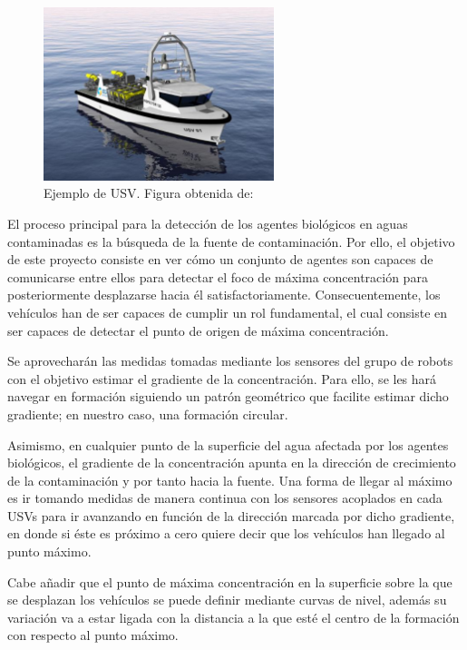 \begin{figure}[htb]
\centering
\includegraphics[width=0.6\textwidth]{figures/USV.eps}
\caption{Ejemplo de USV. Figura obtenida de: \cite{Imagen_Tomada}}\label{fig:USV}
\end{figure}

El proceso principal para la detección de los agentes biológicos en aguas contaminadas es la búsqueda de la fuente de contaminación. Por ello, el objetivo de este proyecto consiste en ver cómo un conjunto de agentes son capaces de comunicarse entre ellos para detectar el foco de máxima concentración para posteriormente desplazarse hacia él satisfactoriamente.
\newpage
Consecuentemente, los vehículos han de ser capaces de cumplir un rol fundamental, el cual consiste en ser capaces de detectar el punto de origen de máxima concentración.

Se aprovecharán las medidas tomadas mediante los sensores del grupo de robots con el objetivo estimar el gradiente de la concentración. Para ello, se les hará navegar en formación siguiendo un patrón geométrico que facilite estimar dicho gradiente; en nuestro caso, una formación circular.

Asimismo, en cualquier punto de la superficie del agua afectada por los agentes biológicos, el gradiente de la concentración apunta en la dirección de crecimiento de la contaminación y por tanto hacia la fuente. Una forma de llegar al máximo es ir tomando medidas de manera continua con los sensores acoplados en cada USVs para ir avanzando en función de la dirección marcada por dicho gradiente, en donde si éste es próximo a cero quiere decir que los vehículos han llegado al punto máximo.

Cabe añadir que el punto de máxima concentración en la superficie sobre la que se desplazan los vehículos se puede definir mediante curvas de nivel, además su variación va a estar ligada con la distancia a la que esté el centro de la formación con respecto al punto máximo.

